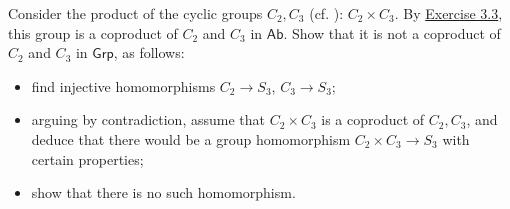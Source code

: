 \documentclass[12pt,letterpaper,boxed]{hmcpset}
\begin{document}
\begin{problem}[3.6]	
	Consider the product of the cyclic groups $C_2,C_3$ (cf. ): $C_2 \times C_3$. By \hyperlink{Exercise 3.3}{Exercise 3.3}, this group is a coproduct of $C_2$ and $C_3$ in $\mathsf{Ab}$. Show that it is not a coproduct of $C_2$ and $C_3$ in $\mathsf{Grp}$, as follows:
	\begin{itemize}
		\item find injective homomorphisms $C_2\rightarrow S_3$, $C_3 \rightarrow S_3$;
		\item arguing by contradiction, assume that $C_2\times C_3$ is a coproduct of $C_2, C_3$, and deduce that there would be a group homomorphism $C_2\times C_3\rightarrow S_3$ with certain properties;
		\item show that there is no such homomorphism.
	\end{itemize}
\end{problem}
\end{document}

